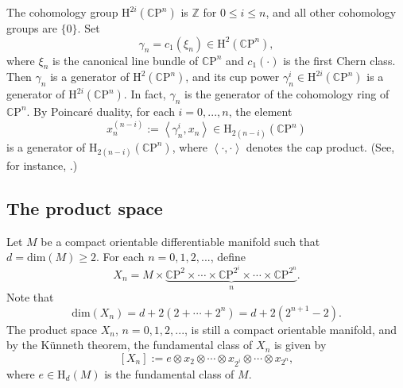 \documentclass[12pt, oneside, psamsfonts]{amsart}
\theoremstyle{definition}
\theoremstyle{remark}
\numberwithin{equation}{section}
\newcommand{\Int}{\mathbb Z}
\newcommand{\Comp}{\mathbb C}
\begin{document}
The cohomology group $\mathrm H^{2i}(\Comp\mathrm{P}^n)$ is $\Int$ for $0 \leq i \leq n$, and all other cohomology groups are $\{0\}$. %
Set
$$\gamma_n = c_1(\xi_n) \in  \mathrm H^{2}(\Comp\mathrm{P}^n) ,$$
where $\xi_n$ is the canonical line bundle of $\Comp\mathrm{P}^n$ and $c_1(\cdot)$ is the first Chern class. Then $\gamma_n$ is a generator of $\mathrm H^{2}(\Comp\mathrm{P}^n)$, and its cup power $\gamma_n^i \in \mathrm H^{2i}(\Comp\mathrm{P}^n)$ is a generator of $\mathrm H^{2i}(\Comp\mathrm{P}^n)$. In fact, $\gamma_n$ is the generator of the cohomology ring of $\Comp\mathrm{P}^n$.  By Poincar\'{e} duality, for each $i=0, ..., n$, the element $$x_n^{(n-i)} := \left<\gamma_n^i, x_n \right> \in \mathrm H_{2(n-i)}( \Comp \mathrm{P}^n)$$
is a generator of $\mathrm H_{2(n-i)}( \Comp \mathrm{P}^n)$, where $\left< \cdot, \cdot\right>$ denotes the cap product. (See, for instance, \cite{Hatcher-AT}.)

\subsection{The product space}
Let $M$ be a compact orientable differentiable manifold such that $d = \mathrm{dim}(M) \geq 2$. For each $n = 0, 1, 2, ... $, define 
\begin{equation}\label{base-space}
X_{n} = M \times \underbrace{\Comp\mathrm P^{2} \times \cdots \times \Comp\mathrm P^{2^i} \times \cdots  \times \Comp\mathrm P^{2^{n}}}_{n}.
\end{equation}
Note that
\begin{equation}\label{dim-Xn}
\mathrm{dim}(X_{n}) = d + 2(2 + \cdots + 2^n) = d + 2(2^{n+1} - 2).
\end{equation}
The product space $X_n$, $n=0, 1, 2, ... $, is still a compact orientable manifold, and by the K\"{u}nneth theorem, the fundamental class of $X_n$ is given by
$$ [X_{n}] :=  e \otimes x_{2} \otimes \cdots \otimes x_{2^i} \otimes \cdots \otimes x_{2^{n}},$$
where %
$e \in \mathrm{H}_{d}(M)$ is the fundamental class of $M$.
\end{document}
